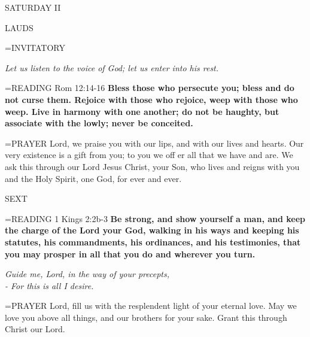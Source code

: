 \begin{center}
\normalsize SATURDAY II
\end{center}

\begin{flushleft}\normalsize LAUDS\\\end{flushleft}

\hangindent=\parindent \small{INVITATORY}
\begin{center}
\textit{Let us listen to the voice of God; let us enter into his rest.\\}
\end{center}

\hangindent=\parindent \small{READING} Rom 12:14-16 \textbf{Bless those who persecute you; bless and do not curse them. Rejoice with those who rejoice, weep with those who weep. Live in harmony with one another; do not be haughty, but associate with the lowly; never be conceited.\\}

\hangindent=\parindent \small{PRAYER  Lord, we praise you with our lips, and with our lives and hearts. Our very existence is a gift from you; to you we off er all that we have and are. We ask this through our Lord Jesus Christ, your Son, who lives and reigns with you and the Holy Spirit, one God, for ever and ever.}

\begin{flushleft}\normalsize SEXT\\\end{flushleft}

\hangindent=\parindent \small{READING} 1 Kings 2:2b-3 \textbf{Be strong, and show yourself a man, and keep the charge of the Lord your God, walking in his ways and keeping his statutes, his commandments, his ordinances, and his testimonies, that you may prosper in all that you do and wherever you turn.}

\begin{center}
\textit{Guide me, Lord, in the way of your precepts,\\
- For this is all I desire.}
\end{center}

\hangindent=\parindent \small{PRAYER  Lord, fill us with the resplendent light of your eternal love.  May we love you above all things, and our brothers for your sake.  Grant this through Christ our Lord.  }
